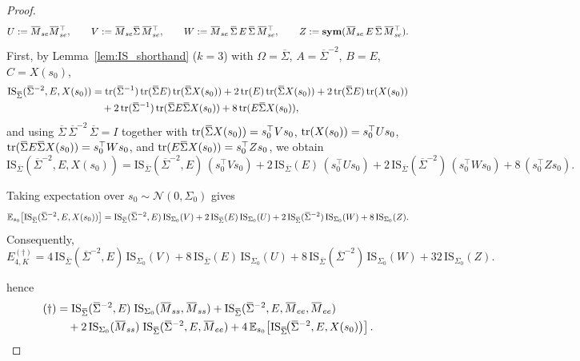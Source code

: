 \begin{proof}
\[
U:=\overline M_{se}\overline M_{se}^\top,\qquad
V:=\overline M_{se}\overline\Sigma\,\overline M_{se}^\top,\qquad
W:=\overline M_{se}\,\overline\Sigma\,E\,\overline\Sigma\,\overline M_{se}^\top,\qquad
Z:=\symfun(\overline M_{se}\,E\,\overline\Sigma\,\overline M_{se}^\top).
\]
First, by Lemma~\ref{lem:IS_shorthand} ($k=3$) with $\Omega=\overline\Sigma$, $A=\overline\Sigma^{-2}$, $B=E$, $C=X(s_0)$,
\begin{align*}
\mathrm{IS}_{\overline\Sigma}(\overline\Sigma^{-2},E,X(s_0))
&=\tr(\overline\Sigma^{-1})\tr(\overline\Sigma E)\tr(\overline\Sigma X(s_0))
+2\tr(E)\tr(\overline\Sigma X(s_0))
+2\tr(\overline\Sigma E)\tr(X(s_0))\\
&\quad+2\tr(\overline\Sigma^{-1})\tr(\overline\Sigma E\overline\Sigma X(s_0))
+8\tr(E\overline\Sigma X(s_0)),
\end{align*}
and using $\overline\Sigma\,\overline\Sigma^{-2}\,\overline\Sigma=I$ together with
$\tr(\overline\Sigma X(s_0))=s_0^\top V s_0$, $\operatorname{tr}(X(s_0))=s_0^\top U s_0$,
$\tr(\overline\Sigma E\overline\Sigma X(s_0))=s_0^\top W s_0$, and $\tr(E\overline\Sigma X(s_0))=s_0^\top Z s_0$,
we obtain
\[
\mathrm{IS}_{\overline\Sigma}(\overline\Sigma^{-2},E,X(s_0))
=
\mathrm{IS}_{\overline\Sigma}(\overline\Sigma^{-2},E)\,(s_0^\top V s_0)
+2\,\mathrm{IS}_{\overline\Sigma}(E)\,(s_0^\top U s_0)
+2\,\mathrm{IS}_{\overline\Sigma}(\overline\Sigma^{-2})\,(s_0^\top W s_0)
+8\,(s_0^\top Z s_0).
\]

Taking expectation over $s_0\sim\mathcal N(0,\Sigma_0)$ gives
\[
\E_{s_0}\!\left[\mathrm{IS}_{\overline\Sigma}(\overline\Sigma^{-2},E,X(s_0))\right]
=
\mathrm{IS}_{\overline\Sigma}(\overline\Sigma^{-2},E)\,\mathrm{IS}_{\Sigma_0}(V)
+2\,\mathrm{IS}_{\overline\Sigma}(E)\,\mathrm{IS}_{\Sigma_0}(U)
+2\,\mathrm{IS}_{\overline\Sigma}(\overline\Sigma^{-2})\,\mathrm{IS}_{\Sigma_0}(W)
+8\,\mathrm{IS}_{\Sigma_0}(Z).
\]
Consequently,
\[
E^{(\dagger)}_{4,K}
=
4\,\mathrm{IS}_{\overline\Sigma}(\overline\Sigma^{-2},E)\,\mathrm{IS}_{\Sigma_0}(V)
+8\,\mathrm{IS}_{\overline\Sigma}(E)\,\mathrm{IS}_{\Sigma_0}(U)
+8\,\mathrm{IS}_{\overline\Sigma}(\overline\Sigma^{-2})\,\mathrm{IS}_{\Sigma_0}(W)
+32\,\mathrm{IS}_{\Sigma_0}(Z).
\]

hence
\begin{equation}\label{eq:dagger-final}
\begin{aligned}
(\dagger)
&=
\mathrm{IS}_{\overline\Sigma}( \overline\Sigma^{-2},E)\;\mathrm{IS}_{\Sigma_0}(\overline M_{ss},\overline M_{ss})
+\mathrm{IS}_{\overline\Sigma}( \overline\Sigma^{-2},E,\overline M_{ee},\overline M_{ee})\\
&\quad
+2\,\mathrm{IS}_{\Sigma_0}(\overline M_{ss})\;\mathrm{IS}_{\overline\Sigma}( \overline\Sigma^{-2},E,\overline M_{ee})
+4\,\E_{s_0}\!\left[\mathrm{IS}_{\overline\Sigma}\!\big( \overline\Sigma^{-2},E,X(s_0)\big)\right].
\end{aligned}
\end{equation}


\end{proof}
